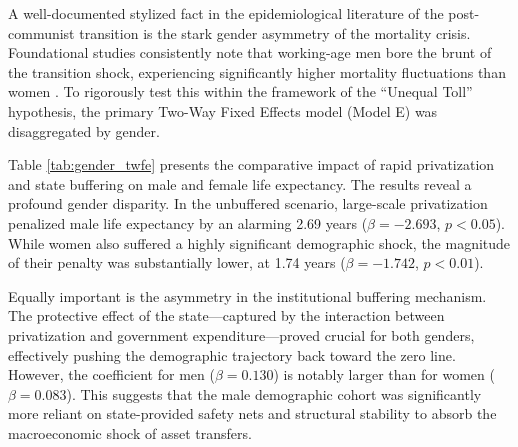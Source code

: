 \documentclass[12pt]{article}
\begin{document}
A well-documented stylized fact in the epidemiological literature of the post-communist transition is the stark gender asymmetry of the mortality crisis. Foundational studies consistently note 
that working-age men bore the brunt of the transition shock, experiencing significantly higher mortality fluctuations than women \citep{B_Brainerd1998, Stuckler2009}. To rigorously test this within 
the framework of the ``Unequal Toll'' hypothesis, the primary Two-Way Fixed Effects model (Model E) was disaggregated by gender.

Table \ref{tab:gender_twfe} presents the comparative impact of rapid privatization and state buffering on male and female life expectancy. The results reveal a profound gender disparity. In the 
unbuffered scenario, large-scale privatization penalized male life expectancy by an alarming 2.69 years ($\beta = -2.693$, $p < 0.05$). While women also suffered a highly significant demographic 
shock, the magnitude of their penalty was substantially lower, at 1.74 years ($\beta = -1.742$, $p < 0.01$). 

Equally important is the asymmetry in the institutional buffering mechanism. The protective effect of the state---captured by the interaction between privatization and government expenditure---proved 
crucial for both genders, effectively pushing the demographic trajectory back toward the zero line. However, the coefficient for men ($\beta = 0.130$) is notably larger than for women ($\beta = 0.083$). 
This suggests that the male demographic cohort was significantly more reliant on state-provided safety nets and structural stability to absorb the macroeconomic shock of asset transfers.
\end{document}
